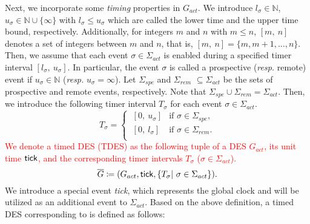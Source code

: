 \documentclass{article}
\newcommand{\tick}{{\sf tick}}
\newcommand{\red}[1]{\textcolor{red}{#1}}
\begin{document}
Next, we incorporate some \textit{timing} properties in $G_{act}$. 
We introduce $l_{\sigma} \in \mathbb{N}$, $u_{\sigma} \in  \mathbb{N} \cup \{\infty\}$ with  $l_{\sigma} \leq u_{\sigma}$ which are called the lower time and the upper time bound, respectively.
Additionally, for integers $m$ and $n$ with $m \leq n$, $[m,\ n]$ denotes a set of integers between $m$ and $n$, that is, $[m,\ n]=\{ m, m+1, \ldots , n\}$.
Then, we assume that each event $\sigma \in \Sigma_{act}$ is enabled during a specified timer interval $[ l_{\sigma},\ u_{\sigma}]$.
%
In particular, the event $\sigma$ is called a prospective ({\sl resp.} remote) event if $u_{\sigma} \in \mathbb{N}$ ({\sl resp.} $u_{\sigma} = \infty$). 
Let $\Sigma_{spe}$ and $\Sigma_{rem}$ $\subseteq \Sigma_{act}$ be the sets of prospective and remote events, respectively.  Note that $\Sigma_{spe} \cup \Sigma_{rem} = \Sigma_{act}$.
Then, we introduce the following timer interval $T_{\sigma}$ for each event $\sigma \in \Sigma_{act}$.
\begin{equation}
\label{T_sigma}
T_{\sigma}= \left\{
\begin{array}{ll}  
\ [ 0,\ u_{\sigma} ]  & \mbox{if } \sigma \in \Sigma_{spe}, \\
\ [ 0,\ l_{\sigma} ] & \mbox{if } \sigma \in \Sigma_{rem}. \\
\end{array} \right.
\end{equation}	 
%
\red{We denote a timed DES (TDES) as the following tuple of a DES $G_{act}$, its unit time $\tick$, and the corresponding timer intervals $T_{\sigma}$ ($\sigma\in \Sigma_{act}$).}
\[
\overline{G}\coloneqq (G_{act},{\tick},\{T_{\sigma} |~\sigma\in \Sigma_{act} \}).
\]
We introduce a special event \textit{tick}, which represents the global clock and will be utilized as an additional event to $\Sigma_{act}$. 
Based on the above definition, a timed DES corresponding to  is defined as follows: 
\end{document}
